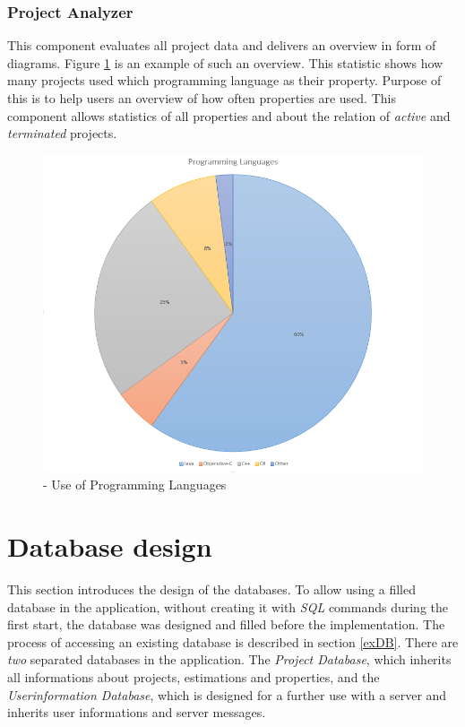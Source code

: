 \subsubsection{\textbf{Project Analyzer}}

This component evaluates all project data and delivers an overview in form of diagrams. Figure \ref{fig:statistic} is an example of such an overview. This statistic shows how many projects used which programming language as their property. Purpose of this is to help users an overview of how often properties are used. This component allows statistics of all properties and about the relation of \textit{active} and \textit{terminated} projects.

\begin{figure}[h] 
	\centering 
	\includegraphics[width=14cm]{images/percentage.png} 
	\caption{- Use of Programming Languages} 
	\label{fig:statistic}
\end{figure}

\section{Database design}

This section introduces the design of the databases. To allow using a filled database in the application, without creating it with \textit{SQL} commands during the first start, the database was designed and filled before the implementation. The process of accessing an existing database is described in section \ref{exDB}. There are \textit{two} separated databases in the application. The \textit{Project Database}, which inherits all informations about projects, estimations and properties, and the \textit{Userinformation Database}, which is designed for a further use with a server and inherits user informations and server messages.\\

